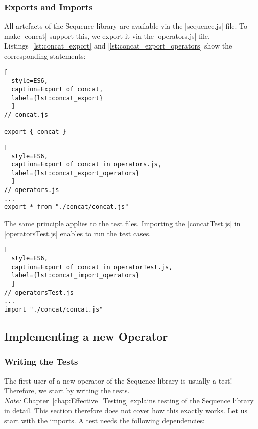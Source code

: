 \subsubsection{Exports and Imports}
\label{subsub:Exports and Imports}
All artefacts of the Sequence library are available via the |sequence.js| file.
To make |concat| support this, we export it via the |operators.js| file.
Listings~\ref{lst:concat_export} and \ref{lst:concat_export_operators} show the
corresponding statements:

\begin{lstlisting}[
  style=ES6, 
  caption=Export of concat,
  label={lst:concat_export}
  ]
// concat.js

export { concat }
\end{lstlisting}



\begin{lstlisting}[
  style=ES6, 
  caption=Export of concat in operators.js,
  label={lst:concat_export_operators}
  ]
// operators.js
...
export * from "./concat/concat.js"
\end{lstlisting}

The same principle applies to the test files. Importing the |concatTest.js| in
|operatorsTest.js| enables to run the test cases.

\begin{lstlisting}[
  style=ES6, 
  caption=Export of concat in operatorTest.js,
  label={lst:concat_import_operators}
  ]
// operatorsTest.js
...
import "./concat/concat.js"
\end{lstlisting}

\subsection{Implementing a new Operator}
\label{subsub:Implementing a new Operator}

\subsubsection{Writing the Tests}
\label{subsub:Write the Tests}
The first user of a new operator of the Sequence library is usually a test!
Therefore, we start by writing the tests.\\
\textit{Note:} Chapter~\ref{chap:Effective_Testing} explains testing of the
Sequence library in detail. This section therefore does not cover how this
exactly works.
\newline
Let us start with the imports. A test needs the following dependencies:


